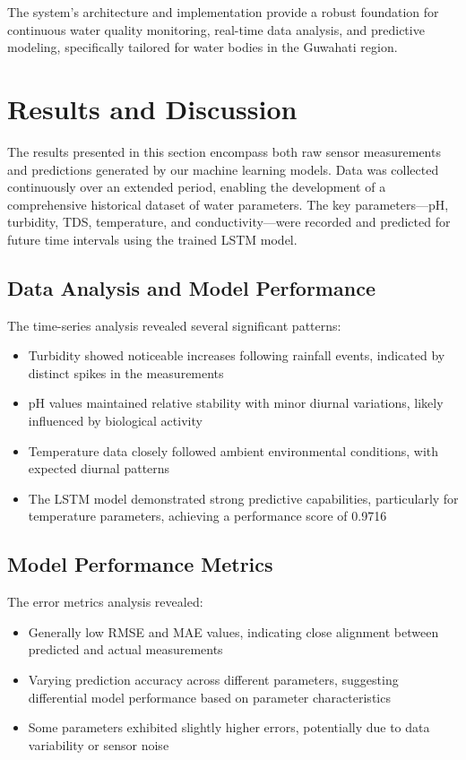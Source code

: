 \documentclass[conference]{IEEEtran}
\begin{document}
The system's architecture and implementation provide a robust foundation for continuous water quality monitoring, real-time data analysis, and predictive modeling, specifically tailored for water bodies in the Guwahati region.

\section{Results and Discussion}
The results presented in this section encompass both raw sensor measurements and predictions generated by our machine learning models. Data was collected continuously over an extended period, enabling the development of a comprehensive historical dataset of water parameters. The key parameters—pH, turbidity, TDS, temperature, and conductivity—were recorded and predicted for future time intervals using the trained LSTM model.

\subsection{Data Analysis and Model Performance}
The time-series analysis revealed several significant patterns:
\begin{itemize}
\item Turbidity showed noticeable increases following rainfall events, indicated by distinct spikes in the measurements
\item pH values maintained relative stability with minor diurnal variations, likely influenced by biological activity
\item Temperature data closely followed ambient environmental conditions, with expected diurnal patterns
\item The LSTM model demonstrated strong predictive capabilities, particularly for temperature parameters, achieving a performance score of 0.9716
\end{itemize}

\subsection{Model Performance Metrics}
The error metrics analysis revealed:
\begin{itemize}
\item Generally low RMSE and MAE values, indicating close alignment between predicted and actual measurements
\item Varying prediction accuracy across different parameters, suggesting differential model performance based on parameter characteristics
\item Some parameters exhibited slightly higher errors, potentially due to data variability or sensor noise
\end{itemize}
\end{document}
